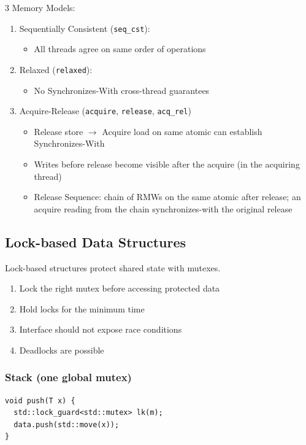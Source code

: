 \documentclass[12pt, a4paper]{article}
\begin{document}
\begin{multicols*}{3}
Memory Models:
\begin{enumerate}[\roman*.]
  \item Sequentially Consistent (\lstinline|seq_cst|):
    \begin{itemize}[leftmargin=*]\vspace{3pt}
      \item All threads agree on same order of operations
    \end{itemize}
  \item Relaxed (\lstinline|relaxed|):
    \begin{itemize}[leftmargin=*]\vspace{3pt}
      \item No Synchronizes-With cross-thread guarantees
    \end{itemize}
  \item Acquire-Release (\lstinline|acquire|, \lstinline|release|, \lstinline|acq_rel|)
    \begin{itemize}[leftmargin=*]\vspace{3pt}
      \item Release store $\rightarrow$ Acquire load on same atomic can establish Synchronizes-With
      \item Writes before release become visible after the acquire (in the acquiring thread)
      \item Release Sequence: chain of RMWs on the same atomic after release; an acquire reading from the chain synchronizes-with the original release
    \end{itemize}
\end{enumerate}
\vspace{-1em}
\colbreak
\subsection{Lock-based Data Structures}
\lstset{style=cpp}
Lock-based structures protect shared state with mutexes.
\begin{enumerate}[\roman*.]
  \item Lock the right mutex before accessing protected data
  \item Hold locks for the minimum time
  \item Interface should not expose race conditions
  \item Deadlocks are possible
\end{enumerate}

\subsubsection{Stack (one global mutex)}
\begin{lstlisting}[basicstyle=\ttfamily\scriptsize]
void push(T x) {
  std::lock_guard<std::mutex> lk(m);
  data.push(std::move(x));
}


\end{lstlisting}
\end{multicols*}
\end{document}
